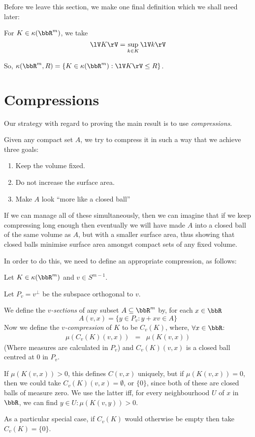 \documentclass[a4paper,11pt]{article}
\begin{document}
Before we leave this section, we make one final definition which we shall need
later:

\begin{defn}
For $K\in\kappa(\bbR^m)$, we take
\[
\lV K\rV=\sup_{k\in K}\lV k\rV
\]
\end{defn}

So, $\kappa(\bbR^m,R)=\{K\in\kappa(\bbR^m):\lV K\rV\leq R\}$.

\section{Compressions}
Our strategy with regard to proving the main result is to use
\emph{compressions}.

Given any compact set $A$, we try to compress it in such a way that we achieve
three goals:
\begin{enumerate}
\item Keep the volume fixed.
\item Do not increase the surface area.
\item Make $A$ look ``more like a closed ball''
\end{enumerate}
If we can manage all of these simultaneously, then we can imagine that if we
keep compressing long enough then eventually we will have made $A$ into a
closed ball of the same volume as $A$, but with a smaller surface area, thus
showing that closed balls minimise surface area amongst compact sets of any
fixed volume.

In order to do this, we need to define an appropriate compression, as follows:

\begin{defn}
\label{defn:compression}
Let $K\in\kappa(\bbR^m)$ and $v\in S^{m-1}$.

Let $P_v=v^\perp$ be the subspace orthogonal to $v$.

We define the \emph{$v$-sections} of any subset $A\subseteq\bbR^m$ by,
for each $x\in\bbR$
\[
A(v,x)=\{y\in P_v:y+xv\in A\}
\]
Now we define the \emph{$v$-compression} of $K$ to be $C_v(K)$, where,
$\forall x\in\bbR$:
%
\begin{eqnarray*}
\mu(C_v(K)(v,x))&=&\mu(K(v,x))
\end{eqnarray*}
%
(Where measures are calculated in $P_v$)
and $C_v(K)(v,x)$ is a closed ball centred at $0$ in $P_v$.

If $\mu(K(v,x))>0$, this defines $C(v,x)$ uniquely, but if $\mu(K(v,x))=0$,
then we could take $C_v(K)(v,x)=\emptyset$, or $\{0\}$, since both of these are
closed balls of measure zero.  We use the latter iff, for every neighbourhood
$U$ of $x$ in $\bbR$, we can find $y\in U:\mu(K(v,y))>0$.

As a particular special case, if $C_v(K)$ would otherwise be empty then take
$C_v(K)=\{0\}$.
\end{defn}
\end{document}
